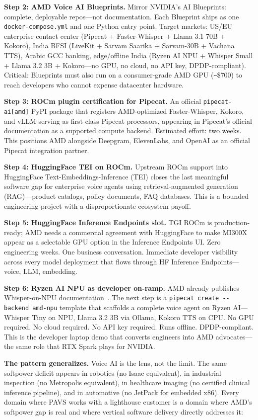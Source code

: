 \documentclass[blind]{gtac}
\begin{document}
\textbf{Step 2: AMD Voice AI Blueprints.}
Mirror NVIDIA's AI Blueprints: complete, deployable repos---not documentation. Each Blueprint ships as one \texttt{docker-compose.yml} and one Python entry point. Target markets: US/EU enterprise contact center (Pipecat + Faster-Whisper + Llama 3.1 70B + Kokoro), India BFSI (LiveKit + Sarvam Saarika + Sarvam-30B + Vachana TTS), Arabic GCC banking, edge/offline India (Ryzen AI NPU + Whisper Small + Llama 3.2 3B + Kokoro---no GPU, no cloud, no API key, DPDP-compliant). Critical: Blueprints must also run on a consumer-grade AMD GPU (\texttt{\textasciitilde}\$700) to reach developers who cannot expense datacenter hardware.

\textbf{Step 3: ROCm plugin certification for Pipecat.}
An official \texttt{pipecat-ai[amd]} PyPI package that registers AMD-optimized Faster-Whisper, Kokoro, and vLLM serving as first-class Pipecat processors, appearing in Pipecat's official documentation as a supported compute backend. Estimated effort: two weeks. This positions AMD alongside Deepgram, ElevenLabs, and OpenAI as an official Pipecat integration partner.

\textbf{Step 4: HuggingFace TEI on ROCm.}
Upstream ROCm support into HuggingFace Text-Embeddings-Inference (TEI) closes the last meaningful software gap for enterprise voice agents using retrieval-augmented generation (RAG)---product catalogs, policy documents, FAQ databases. This is a bounded engineering project with a disproportionate ecosystem payoff.

\textbf{Step 5: HuggingFace Inference Endpoints slot.}
TGI ROCm is production-ready; AMD needs a commercial agreement with HuggingFace to make MI300X appear as a selectable GPU option in the Inference Endpoints UI. Zero engineering weeks. One business conversation. Immediate developer visibility across every model deployment that flows through HF Inference Endpoints---voice, LLM, embedding.

\textbf{Step 6: Ryzen AI NPU as developer on-ramp.}
AMD already publishes Whisper-on-NPU documentation~\cite{amd_ryzen_whisper}. The next step is a \texttt{pipecat create {-}{-}backend amd-npu} template that scaffolds a complete voice agent on Ryzen AI---Whisper Tiny on NPU, Llama 3.2 3B via Ollama, Kokoro TTS on CPU. No GPU required. No cloud required. No API key required. Runs offline. DPDP-compliant. This is the developer laptop demo that converts engineers into AMD advocates---the same role that RTX Spark plays for NVIDIA.

\textbf{The pattern generalizes.}
Voice AI is the lens, not the limit. The same softpower deficit appears in robotics (no Isaac equivalent), in industrial inspection (no Metropolis equivalent), in healthcare imaging (no certified clinical inference pipeline), and in automotive (no JetPack for embedded x86). Every domain where PAVS works with a lighthouse customer is a domain where AMD's softpower gap is real and where vertical software delivery directly addresses it:
\end{document}
